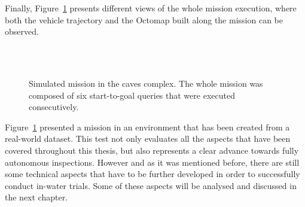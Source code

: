 Finally, Figure~\ref{fig:CavesMultS2G} presents different views of the whole
mission execution, where both the vehicle trajectory and the Octomap built along
the mission can be observed.



\begin{figure}[htbp]
\myfloatalign
	\quad
   	\\
   	\quad
   	\\
   	\quad
\caption[Simulated mission in the caves complex. Whole mission execution.]
{Simulated mission in the caves complex. The whole mission was composed of six
start-to-goal queries that were executed consecutively.}
\label{fig:CavesMultS2G}
\end{figure}

Figure~\ref{fig:CavesMultS2G} presented a mission in an environment that has
been created from a real-world dataset. This test not only evaluates all the
aspects that have been covered throughout this thesis, but also represents a
clear advance towards fully autonomous inspections. However and as it was
mentioned before, there are still some technical aspects that have to be further
developed in order to successfully conduct in-water trials. Some of these
aspects will be analysed and discussed in the next chapter.

